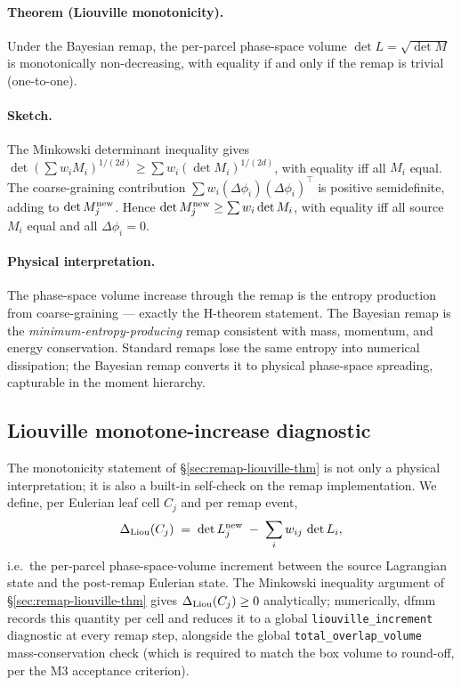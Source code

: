\documentclass[11pt]{article}
\begin{document}
\paragraph{Theorem (Liouville monotonicity).} Under the Bayesian
remap, the per-parcel phase-space volume $\det L = \sqrt{\det M}$
is monotonically non-decreasing, with equality if and only if the
remap is trivial (one-to-one).

\paragraph{Sketch.} The Minkowski determinant inequality gives
$\det(\sum w_i M_i)^{1/(2d)}\geq\sum w_i (\det M_i)^{1/(2d)}$, with
equality iff all $M_i$ equal. The coarse-graining contribution
$\sum w_i(\Delta\phi_i)(\Delta\phi_i)^\top$ is positive semidefinite,
adding to $\det M_j^{\rm new}$. Hence $\det M_j^{\rm new}\geq\sum w_i\det M_i$,
with equality iff all source $M_i$ equal and all $\Delta\phi_i = 0$.

\paragraph{Physical interpretation.} The phase-space volume increase
through the remap is the entropy production from coarse-graining ---
exactly the H-theorem statement. The Bayesian remap is the
\emph{minimum-entropy-producing} remap consistent with mass,
momentum, and energy conservation. Standard remaps lose the same
entropy into numerical dissipation; the Bayesian remap converts it
to physical phase-space spreading, capturable in the moment
hierarchy.

\subsection{Liouville monotone-increase diagnostic}
\label{sec:remap-liouville-diag}

The monotonicity statement of \S\ref{sec:remap-liouville-thm} is not only a
physical interpretation; it is also a built-in self-check on the
remap implementation. We define, per Eulerian leaf cell $C_j$ and
per remap event,
\begin{equation}
  \Delta_{\rm Liou}(C_j)
  \;=\;
  \det L_j^{\rm new} \;-\; \sum_i w_{ij}\,\det L_i,
  \label{eq:liouville-increment}
\end{equation}
i.e.\ the per-parcel phase-space-volume increment between the source
Lagrangian state and the post-remap Eulerian state. The Minkowski
inequality argument of \S\ref{sec:remap-liouville-thm} gives
$\Delta_{\rm Liou}(C_j) \geq 0$ analytically; numerically, dfmm
records this quantity per cell and reduces it to a global
\texttt{liouville\_increment} diagnostic at every remap step,
alongside the global \texttt{total\_overlap\_volume} mass-conservation
check (which is required to match the box volume to round-off, per
the M3 acceptance criterion).
\end{document}
